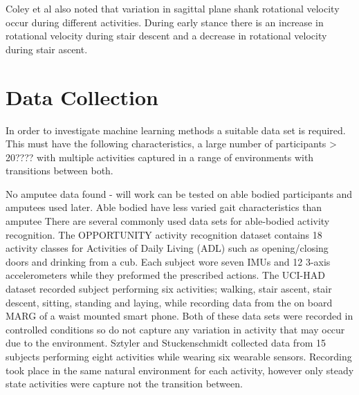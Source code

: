 \documentclass[sensors,article,submit,moreauthors,pdftex]{Definitions/mdpi}
\begin{document}
Coley et al also noted that variation in sagittal plane shank rotational velocity occur during different activities. During early stance there is an increase in rotational velocity during stair descent and a decrease in rotational velocity during stair ascent.\cite{Coley2005}



\section{Data Collection}
In order to investigate machine learning methods a suitable data set is required. This must have the following characteristics, a large number of participants > 20???? with multiple activities captured in a range of environments with transitions between both.

No amputee data found - will work can be tested on able bodied participants and amputees used later. Able bodied have less varied gait characteristics than amputee 
There are several commonly used data sets for able-bodied activity recognition. The OPPORTUNITY activity recognition dataset\cite{roggan2010} contains 18 activity classes for Activities of Daily Living (ADL) such as opening/closing doors and drinking from a cub. Each subject wore seven IMUs and 12 3-axis accelerometers while they preformed the prescribed actions. The UCI-HAD dataset\cite{Anguita2013} recorded subject performing six activities; walking, stair ascent, stair descent, sitting, standing and laying, while recording data from the on board MARG of a waist mounted smart phone. Both of these data sets were recorded in controlled conditions so do not capture any variation in activity that may occur due to the environment. Sztyler and Stuckenschmidt collected data from 15 subjects performing eight activities while wearing six wearable sensors. Recording took place in the same natural environment for each activity, however only steady state activities were capture not the transition between.\cite{Sztyler2017} 
\end{document}
